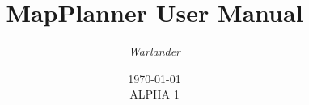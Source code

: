 \documentclass[12pt,a4paper,titlepage]{article}
\title{MapPlanner User Manual}
\author{\itshape Warlander}
\date{\today\\ALPHA 1}
\begin{document}
	\maketitle
	\pagebreak
	
	\tableofcontents
	\pagebreak
	
	
	\pagebreak
	
\end{document}
